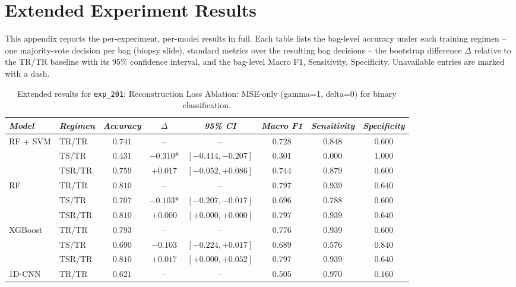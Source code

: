 \section{Extended Experiment Results}
\label{app:extended_results}
\setcounter{table}{0}
\renewcommand{\thetable}{\Alph{section}.\arabic{table}}

This appendix reports the per-experiment, per-model results in full. Each table lists the bag-level accuracy under each training regimen -- one majority-vote decision per bag (biopsy slide), standard metrics over the resulting bag decisions -- the bootstrap difference $\Delta$ relative to the TR/TR baseline with its 95\% confidence interval, and the bag-level Macro F1, Sensitivity, Specificity. Unavailable entries are marked with a dash.

\begin{table}[H]
\centering
\scriptsize
\caption{Extended results for \texttt{exp\_201}: Reconstruction Loss Ablation: MSE-only (gamma=1, delta=0) for binary classification.}
\label{tab:appendix_exp_201}
\begin{tabular*}{\textwidth}{@{\extracolsep{\fill}}llcccccc}
\toprule
\emph{Model} & \emph{Regimen} & \emph{Accuracy} & \emph{$\Delta$} & \emph{95\% CI} & \emph{Macro F1} & \emph{Sensitivity} & \emph{Specificity}\\
\midrule
\multirow{3}{*}{RF + SVM} & TR/TR & $0.741$ & -- & -- & $0.728$ & $0.848$ & $0.600$\\
 & TS/TR & $0.431$ & $-0.310$* & $[-0.414, -0.207]$ & $0.301$ & $0.000$ & $1.000$\\
 & TSR/TR & $0.759$ & $+0.017$ & $[-0.052, +0.086]$ & $0.744$ & $0.879$ & $0.600$\\
\midrule
\multirow{3}{*}{RF} & TR/TR & $0.810$ & -- & -- & $0.797$ & $0.939$ & $0.640$\\
 & TS/TR & $0.707$ & $-0.103$* & $[-0.207, -0.017]$ & $0.696$ & $0.788$ & $0.600$\\
 & TSR/TR & $0.810$ & $+0.000$ & $[+0.000, +0.000]$ & $0.797$ & $0.939$ & $0.640$\\
\midrule
\multirow{3}{*}{XGBoost} & TR/TR & $0.793$ & -- & -- & $0.776$ & $0.939$ & $0.600$\\
 & TS/TR & $0.690$ & $-0.103$ & $[-0.224, +0.017]$ & $0.689$ & $0.576$ & $0.840$\\
 & TSR/TR & $0.810$ & $+0.017$ & $[+0.000, +0.052]$ & $0.797$ & $0.939$ & $0.640$\\
\midrule
\multirow{3}{*}{1D-CNN} & TR/TR & $0.621$ & -- & -- & $0.505$ & $0.970$ & $0.160$\\

\end{tabular*}
\end{table}
